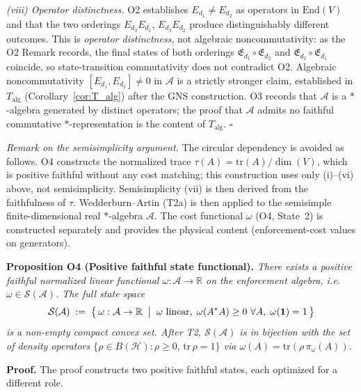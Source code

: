 \documentclass[11pt]{article}
\theoremstyle{remark}
\begin{document}
\textit{(viii) Operator distinctness.}  O2 establishes $E_{d_1} \ne E_{d_2}$ as operators in $\mathrm{End}(V)$ and that the two orderings $E_{d_3}E_{d_1}$, $E_{d_3}E_{d_2}$ produce distinguishably different outcomes.  This is \emph{operator distinctness}, not algebraic noncommutativity: as the O2 Remark records, the final states of both orderings $\mathfrak{E}_{d_1}\circ\mathfrak{E}_{d_2}$ and $\mathfrak{E}_{d_2}\circ\mathfrak{E}_{d_1}$ coincide, so state-transition commutativity does not contradict O2.  Algebraic noncommutativity $[E_{d_1},E_{d_2}] \ne 0$ in $\mathcal{A}$ is a strictly stronger claim, established in $T_{\mathrm{alg}}$ (Corollary~\ref{cor:T_alg}) after the GNS construction.  O3 records that $\mathcal{A}$ is a $*$-algebra generated by distinct operators; the proof that $\mathcal{A}$ admits no faithful commutative $*$-representation is the content of $T_{\mathrm{alg}}$.  \hfill$\square$

\smallskip\noindent\textit{Remark on the semisimplicity argument.}  The circular dependency is avoided as follows.  O4 constructs the normalized trace $\tau(A) = \mathrm{tr}(A)/\dim(V)$, which is positive faithful without any cost matching; this construction uses only (i)--(vi) above, not semisimplicity.  Semisimplicity (vii) is then derived from the faithfulness of $\tau$.  Wedderburn--Artin (T2a) is then applied to the semisimple finite-dimensional real $*$-algebra $\mathcal{A}$.  The cost functional $\omega$ (O4, State~2) is constructed separately and provides the physical content (enforcement-cost values on generators).

\smallskip\noindent\textbf{Proposition O4 (Positive faithful state functional).}
\emph{There exists a positive faithful normalized linear functional $\omega: \mathcal{A} \to \mathbb{R}$ on the enforcement algebra, i.e.\ $\omega \in \mathcal{S}(\mathcal{A})$.  The full state space
\[
\mathcal{S}(\mathcal{A}) \;:=\; \bigl\{\,\omega : \mathcal{A} \to \mathbb{R} \;\bigm|\; \omega \text{ linear},\; \omega(A^*A) \ge 0 \ \forall A,\; \omega(\mathbf{1}) = 1\,\bigr\}
\]
is a non-empty compact convex set.  After T2, $\mathcal{S}(\mathcal{A})$ is in bijection with the set of density operators $\{\rho \in B(\mathcal{H}) : \rho \ge 0,\, \mathrm{tr}\,\rho = 1\}$ via $\omega(A) = \mathrm{tr}(\rho\,\pi_\omega(A))$.}

\smallskip\noindent\textbf{Proof.}
The proof constructs two positive faithful states, each optimized for a different role.
\end{document}
